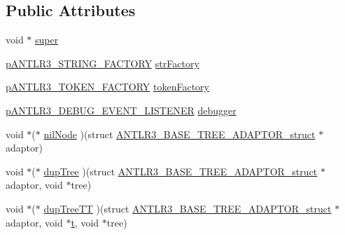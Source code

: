 \subsection*{Public Attributes}
\begin{DoxyCompactItemize}
\item 
void $\ast$ \hyperlink{struct_a_n_t_l_r3___b_a_s_e___t_r_e_e___a_d_a_p_t_o_r__struct_a092b489ee69367239890aa924adf649b}{super}
\item 
\hyperlink{antlr3interfaces_8h_a499a87287d582de04cf736f342b20692}{p\-A\-N\-T\-L\-R3\-\_\-\-S\-T\-R\-I\-N\-G\-\_\-\-F\-A\-C\-T\-O\-R\-Y} \hyperlink{struct_a_n_t_l_r3___b_a_s_e___t_r_e_e___a_d_a_p_t_o_r__struct_a1d0f9410b986257f740faa368ee9caf0}{str\-Factory}
\item 
\hyperlink{antlr3interfaces_8h_af96b167289185ada815149739b2d0cf8}{p\-A\-N\-T\-L\-R3\-\_\-\-T\-O\-K\-E\-N\-\_\-\-F\-A\-C\-T\-O\-R\-Y} \hyperlink{struct_a_n_t_l_r3___b_a_s_e___t_r_e_e___a_d_a_p_t_o_r__struct_add2f3c0291fa5a108a963408b8db39a6}{token\-Factory}
\item 
\hyperlink{antlr3interfaces_8h_ab226a624395fcc0b8fe2b29ae60b6116}{p\-A\-N\-T\-L\-R3\-\_\-\-D\-E\-B\-U\-G\-\_\-\-E\-V\-E\-N\-T\-\_\-\-L\-I\-S\-T\-E\-N\-E\-R} \hyperlink{struct_a_n_t_l_r3___b_a_s_e___t_r_e_e___a_d_a_p_t_o_r__struct_af2d558faa308c0d544780b9a666b0728}{debugger}
\item 
void $\ast$($\ast$ \hyperlink{struct_a_n_t_l_r3___b_a_s_e___t_r_e_e___a_d_a_p_t_o_r__struct_ad83ac19a889169a7b3a63a3cca09ed05}{nil\-Node} )(struct \hyperlink{struct_a_n_t_l_r3___b_a_s_e___t_r_e_e___a_d_a_p_t_o_r__struct}{A\-N\-T\-L\-R3\-\_\-\-B\-A\-S\-E\-\_\-\-T\-R\-E\-E\-\_\-\-A\-D\-A\-P\-T\-O\-R\-\_\-struct} $\ast$adaptor)
\item 
void $\ast$($\ast$ \hyperlink{struct_a_n_t_l_r3___b_a_s_e___t_r_e_e___a_d_a_p_t_o_r__struct_a4835b9a40caacdadffa966b9c55b2cd2}{dup\-Tree} )(struct \hyperlink{struct_a_n_t_l_r3___b_a_s_e___t_r_e_e___a_d_a_p_t_o_r__struct}{A\-N\-T\-L\-R3\-\_\-\-B\-A\-S\-E\-\_\-\-T\-R\-E\-E\-\_\-\-A\-D\-A\-P\-T\-O\-R\-\_\-struct} $\ast$adaptor, void $\ast$tree)
\item 
void $\ast$($\ast$ \hyperlink{struct_a_n_t_l_r3___b_a_s_e___t_r_e_e___a_d_a_p_t_o_r__struct_a5696836efd7978d4db91d59e018abda1}{dup\-Tree\-T\-T} )(struct \hyperlink{struct_a_n_t_l_r3___b_a_s_e___t_r_e_e___a_d_a_p_t_o_r__struct}{A\-N\-T\-L\-R3\-\_\-\-B\-A\-S\-E\-\_\-\-T\-R\-E\-E\-\_\-\-A\-D\-A\-P\-T\-O\-R\-\_\-struct} $\ast$adaptor, void $\ast$\hyperlink{showimage_8m_ad941f6ef920fbfb3d75b60ddbedbdd39}{t}, void $\ast$tree)

\end{DoxyCompactItemize}
